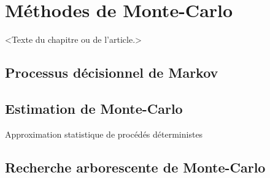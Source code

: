 \chapter{Méthodes de Monte-Carlo}     %
\label{chap:montecarlo}                   %

<Texte du chapitre ou de l'article.>

\section{Processus décisionnel de Markov}

\section{Estimation de Monte-Carlo}

Approximation statistique de procédés déterministes

\section{Recherche arborescente de Monte-Carlo}